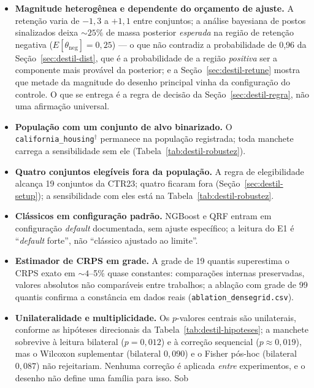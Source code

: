 \begin{itemize}
  \item \textbf{Magnitude heterogênea e dependente do orçamento de
    ajuste.} A retenção varia de $-1{,}3$ a $+1{,}1$ entre conjuntos;
    a análise bayesiana de postos sinalizados deixa ${\sim}25\%$ de
    massa posterior \emph{esperada} na região de retenção negativa
    ($E[\theta_{\text{neg}}]=0{,}25$) --- o que não contradiz a
    probabilidade de 0,96 da Seção~\ref{sec:destil-dist}, que é a
    probabilidade de a região \emph{positiva} ser a componente mais
    provável da posterior; e a
    Seção~\ref{sec:destil-retune} mostra que metade da
    magnitude do desenho principal vinha da configuração do controle.
    O que se entrega é a regra de decisão da
    Seção~\ref{sec:destil-regra}, não uma afirmação universal.
  \item \textbf{População com um conjunto de alvo binarizado.} O
    \texttt{california\_housing}$^\dagger$ permanece na população
    registrada; toda manchete carrega a sensibilidade sem ele
    (Tabela~\ref{tab:destil-robustez}).
  \item \textbf{Quatro conjuntos elegíveis fora da população.} A regra
    de elegibilidade alcança 19 conjuntos da CTR23; quatro ficaram
    fora (Seção~\ref{sec:destil-setup}); a sensibilidade com eles está
    na Tabela~\ref{tab:destil-robustez}.
  \item \textbf{Clássicos em configuração padrão.} NGBoost e QRF
    entram em configuração \emph{default} documentada, sem ajuste
    específico; a leitura do E1 é ``\emph{default} forte'', não
    ``clássico ajustado ao limite''.
  \item \textbf{Estimador de CRPS em grade.} A grade de 19 quantis
    superestima o CRPS exato em ${\sim}4$--5\% quase constantes:
    comparações internas preservadas, valores absolutos não
    comparáveis entre trabalhos; a ablação com grade de 99 quantis
    confirma a constância em dados reais
    (\texttt{ablation\_\allowbreak densegrid.csv}).
  \item \textbf{Unilateralidade e multiplicidade.} Os $p$-valores
    centrais são unilaterais, conforme as hipóteses direcionais da
    Tabela~\ref{tab:destil-hipoteses}; a manchete sobrevive à leitura
    bilateral ($p=0{,}012$) e à correção sequencial
    ($p\approx0{,}019$), mas o Wilcoxon suplementar (bilateral
    $0{,}090$) e o Fisher pós-hoc (bilateral $0{,}087$) não
    rejeitariam. Nenhuma correção é aplicada \emph{entre}
    experimentos, e o desenho não define uma família para isso. Sob

\end{itemize}
